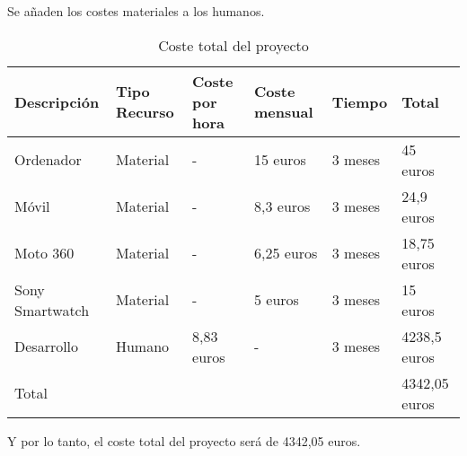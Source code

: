 \noindent
Se añaden los costes materiales a los humanos.
\begin{table}[H]
\centering
\caption{Coste total del proyecto}
\label{Coste total del proyecto}
\begin{tabular}{llllll}
\hline
\multicolumn{1}{|l|}{Descripción}     & \multicolumn{1}{l|}{Tipo Recurso} & \multicolumn{1}{l|}{Coste por hora} & \multicolumn{1}{l|}{Coste mensual} & \multicolumn{1}{l|}{Tiempo}  & \multicolumn{1}{l|}{Total}            \\ \hline
\multicolumn{1}{|l|}{Ordenador}       & \multicolumn{1}{l|}{Material}     & \multicolumn{1}{l|}{-}              & \multicolumn{1}{l|}{15 euros}      & \multicolumn{1}{l|}{3 meses} & \multicolumn{1}{l|}{45 euros}         \\ \hline
\multicolumn{1}{|l|}{Móvil}           & \multicolumn{1}{l|}{Material}     & \multicolumn{1}{l|}{-}              & \multicolumn{1}{l|}{8,3 euros}     & \multicolumn{1}{l|}{3 meses} & \multicolumn{1}{l|}{24,9 euros}       \\ \hline
\multicolumn{1}{|l|}{Moto 360}        & \multicolumn{1}{l|}{Material}     & \multicolumn{1}{l|}{-}              & \multicolumn{1}{l|}{6,25 euros}    & \multicolumn{1}{l|}{3 meses} & \multicolumn{1}{l|}{18,75 euros}      \\ \hline
\multicolumn{1}{|l|}{Sony Smartwatch} & \multicolumn{1}{l|}{Material}     & \multicolumn{1}{l|}{-}              & \multicolumn{1}{l|}{5 euros}       & \multicolumn{1}{l|}{3 meses} & \multicolumn{1}{l|}{15 euros}         \\ \hline
\multicolumn{1}{|l|}{Desarrollo}      & \multicolumn{1}{l|}{Humano}       & \multicolumn{1}{l|}{8,83 euros}     & \multicolumn{1}{l|}{-}             & \multicolumn{1}{l|}{3 meses} & \multicolumn{1}{l|}{4238,5 euros}     \\ \hline
Total                                 &                                   &                                     &                                    &                              & \cellcolor[HTML]{38FFF8}4342,05 euros
\end{tabular}
\end{table}
\noindent
Y por lo tanto, el coste total del proyecto será de 4342,05 euros.
